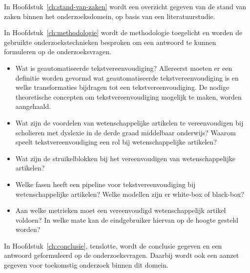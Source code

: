 In Hoofdstuk~\ref{ch:stand-van-zaken} wordt een overzicht gegeven van de stand van zaken binnen het onderzoeksdomein, op basis van een literatuurstudie.

In Hoofdstuk~\ref{ch:methodologie} wordt de methodologie toegelicht en worden de gebruikte onderzoekstechnieken besproken om een antwoord te kunnen formuleren op de onderzoeksvragen.


\begin{itemize}
	\item Wat is geautomatiseerde tekstvereenvoudiging? Allereerst moeten er een definitie worden gevormd wat geautomatiseerde tekstvereenvoudiging is en welke transformaties bijdragen tot een tekstvereenvoudiging. De nodige theoretische concepten om tekstvereenvoudiging mogelijk te maken, worden aangehaald. 
	\item Wat zijn de voordelen van wetenschappelijke artikelen te vereenvoudigen bij scholieren met dyslexie in de derde graad middelbaar onderwijs? Waarom speelt tekstvereenvoudiging een rol bij wetenschappelijke artikelen?
	\item Wat zijn de struikelblokken bij het vereenvoudigen van wetenschappelijke artikelen?
	\item Welke fasen heeft een pipeline voor tekstvereenvoudiging bij wetenschappelijke artikelen? Welke modellen zijn er white-box of black-box?
	\item Aan welke metrieken moet een vereenvoudigd wetenschappelijk artikel voldoen? In welke mate kan de eindgebruiker hiervan op de hoogte gesteld worden? 
\end{itemize}

In Hoofdstuk~\ref{ch:conclusie}, tenslotte, wordt de conclusie gegeven en een antwoord geformuleerd op de onderzoeksvragen. Daarbij wordt ook een aanzet gegeven voor toekomstig onderzoek binnen dit domein.